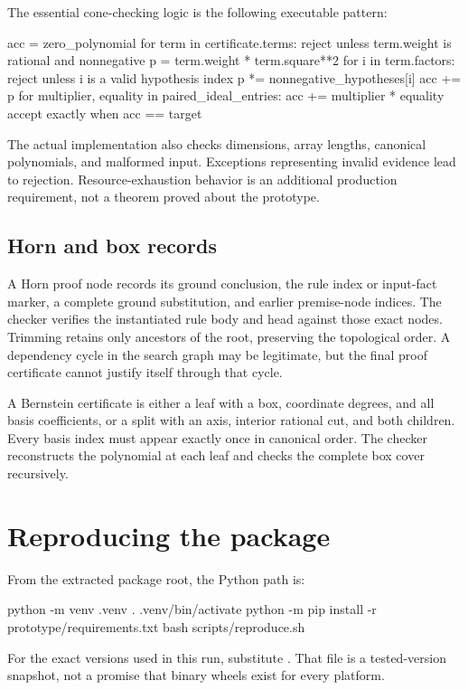 The essential cone-checking logic is the following executable pattern:
\begin{Code}
acc = zero_polynomial
for term in certificate.terms:
    reject unless term.weight is rational and nonnegative
    p = term.weight * term.square**2
    for i in term.factors:
        reject unless i is a valid hypothesis index
        p *= nonnegative_hypotheses[i]
    acc += p
for multiplier, equality in paired_ideal_entries:
    acc += multiplier * equality
accept exactly when acc == target
\end{Code}

The actual implementation also checks dimensions, array lengths, canonical
polynomials, and malformed input. Exceptions representing invalid evidence
lead to rejection. Resource-exhaustion behavior is an additional production
requirement, not a theorem proved about the prototype.

\subsection{Horn and box records}

A Horn proof node records its ground conclusion, the rule index or input-fact
marker, a complete ground substitution, and earlier premise-node indices.
The checker verifies the instantiated rule body and head against those exact
nodes. Trimming retains only ancestors of the root, preserving the topological
order. A dependency cycle in the search graph may be legitimate, but the final
proof certificate cannot justify itself through that cycle.

A Bernstein certificate is either a leaf with a box, coordinate degrees, and
all basis coefficients, or a split with an axis, interior rational cut, and
both children. Every basis index must appear exactly once in canonical order.
The checker reconstructs the polynomial at each leaf and checks the complete
box cover recursively.

\section{Reproducing the package}

From the extracted package root, the Python path is:
\begin{Code}
python -m venv .venv
. .venv/bin/activate
python -m pip install -r prototype/requirements.txt
bash scripts/reproduce.sh
\end{Code}

For the exact versions used in this run, substitute
. That file is a tested-version
snapshot, not a promise that binary wheels exist for every platform.

